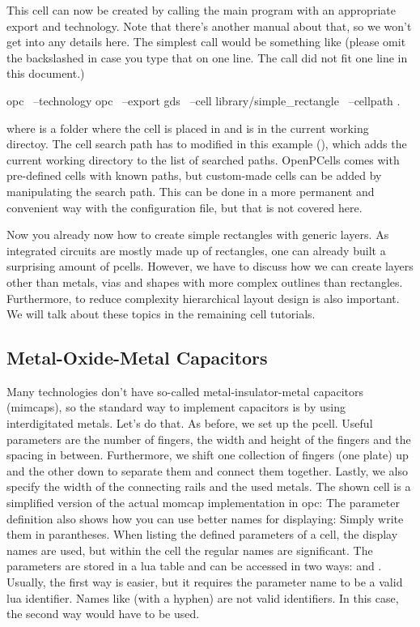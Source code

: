 This cell can now be created by calling the main program with an appropriate export and technology.
Note that there's another manual about that, so we won't get into any details here.
The simplest call would be something like (please omit the backslashed in case you type that on one line. The call did not fit one line in this document.)
\begin{shellcode}
    opc \
        --technology opc \
        --export gds \
        --cell library/simple_rectangle \
        --cellpath .
\end{shellcode}
where  is a folder where the cell is placed in and is in the current working directoy.
The cell search path has to modified in this example (), which adds the current working directory to the list of searched paths.
OpenPCells comes with pre-defined cells with known paths, but custom-made cells can be added by manipulating the search path.
This can be done in a more permanent and convenient way with the configuration file, but that is not covered here.

Now you already now how to create simple rectangles with generic layers.
As integrated circuits are mostly made up of rectangles, one can already built a surprising amount of pcells.
However, we have to discuss how we can create layers other than metals, vias and shapes with more complex outlines than rectangles.
Furthermore, to reduce complexity hierarchical layout design is also important.
We will talk about these topics in the remaining cell tutorials.

\subsection{Metal-Oxide-Metal Capacitors}
Many technologies don't have so-called metal-insulator-metal capacitors (mimcaps), so the standard way to implement capacitors is by using interdigitated metals.
Let's do that. As before, we set up the pcell. Useful parameters are the number of fingers, the width and height of the fingers and the spacing in between.
Furthermore, we shift one collection of fingers (one plate) up and the other down to separate them and connect them together.
Lastly, we also specify the width of the connecting rails and the used metals.
The shown cell is a simplified version of the actual momcap implementation in opc:
\luafilelisting[firstline = 1, lastline = 13]{code/momcap.lua}
The parameter definition also shows how you can use better names for displaying: Simply write them in parantheses.
When listing the defined parameters of a cell, the display names are used, but within the cell the regular names are significant.
The parameters are stored in a lua table and can be accessed in two ways:
\luainline{_P.fingers} and \luainline{_P["fingers"]}.
Usually, the first way is easier, but it requires the parameter name to be a valid lua identifier.
Names like \luainline{foo-bar} (with a hyphen) are not valid identifiers.
In this case, the second way would have to be used.

